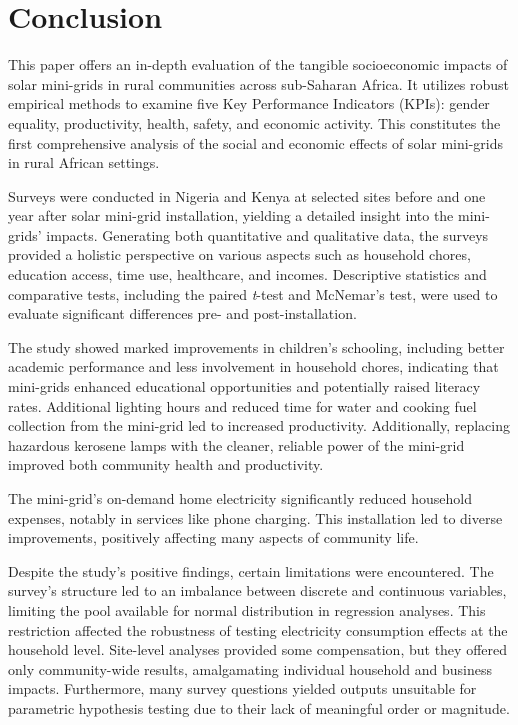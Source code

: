 \section{Conclusion}
\label{sec:conclusion}
This paper offers an in-depth evaluation of the tangible socioeconomic impacts of solar mini-grids in rural communities across sub-Saharan Africa. It utilizes robust empirical methods to examine five Key Performance Indicators (KPIs): gender equality, productivity, health, safety, and economic activity. This constitutes the first comprehensive analysis of the social and economic effects of solar mini-grids in rural African settings.

Surveys were conducted in Nigeria and Kenya at selected sites before and one year after solar mini-grid installation, yielding a detailed insight into the mini-grids' impacts. Generating both quantitative and qualitative data, the surveys provided a holistic perspective on various aspects such as household chores, education access, time use, healthcare, and incomes. Descriptive statistics and comparative tests, including the paired \textit{t}-test and McNemar's test, were used to evaluate significant differences pre- and post-installation.

The study showed marked improvements in children's schooling, including better academic performance and less involvement in household chores, indicating that mini-grids enhanced educational opportunities and potentially raised literacy rates. Additional lighting hours and reduced time for water and cooking fuel collection from the mini-grid led to increased productivity. Additionally, replacing hazardous kerosene lamps with the cleaner, reliable power of the mini-grid improved both community health and productivity.

The mini-grid's on-demand home electricity significantly reduced household expenses, notably in services like phone charging. This installation led to diverse improvements, positively affecting many aspects of community life.

Despite the study's positive findings, certain limitations were encountered. The survey's structure led to an imbalance between discrete and continuous variables, limiting the pool available for normal distribution in regression analyses. This restriction affected the robustness of testing electricity consumption effects at the household level. Site-level analyses provided some compensation, but they offered only community-wide results, amalgamating individual household and business impacts. Furthermore, many survey questions yielded outputs unsuitable for parametric hypothesis testing due to their lack of meaningful order or magnitude.

